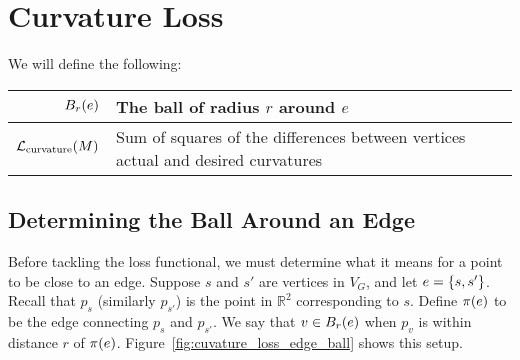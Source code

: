 \section{Curvature Loss}

We will define the following: \begin{center}\begin{tabular}{r|l}
	\(B_r\pof{e}\) & The ball of radius \(r\) around \(e\) \\ \hline
	\(\mathcal{L}_{\mathrm{curvature}}\pof{M}\) & Sum of squares of the differences between vertices actual and desired curvatures
\end{tabular}\end{center}

\subsection{Determining the Ball Around an Edge}

Before tackling the loss functional, we must determine what it means for a point to be close to an edge. Suppose \(s\) and \(s'\) are vertices in \(V_G\), and let \(e = \cof{s, s'}\). Recall that \(p_s\) (similarly \(p_{s'}\)) is the point in \(\mathbb{R}^2\) corresponding to \(s\). Define \(\pi\pof{e}\) to be the edge connecting \(p_s\) and \(p_{s'}\). We say that \(v \in B_r\pof{e}\) when \(p_v\) is within distance \(r\) of \(\pi\pof{e}\). Figure~\ref{fig:cuvature_loss_edge_ball} shows this setup.

